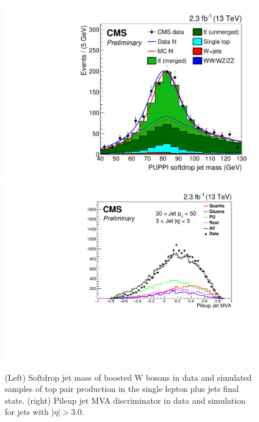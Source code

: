 \begin{figure}[htb]
\begin{center}
\includegraphics[width=.35\textwidth]{WG3_plots/CMS-PAS-JME-16-003_Figure_018-c}
\includegraphics[width=.42\textwidth]{WG3_plots/CMS-PAS-JME-16-003_Figure_014-b}
\end{center}
\caption{(Left) Softdrop jet mass of boosted W bosons in data and simulated samples of top pair production in the single lepton plus jets final state.
(right) Pileup jet MVA discriminator in data and simulation for jets with $|\eta|>3.0$.}
\label{fig:CMSsubstructure}
\end{figure}

